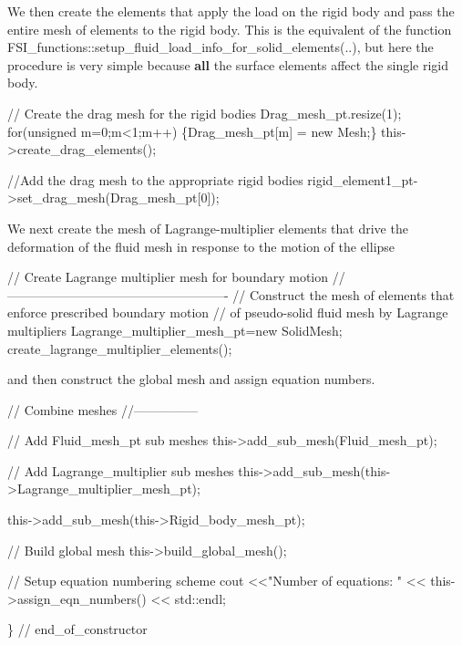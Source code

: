 We then create the elements that apply the load on the rigid body and pass the entire mesh of elements to the rigid body. This is the equivalent of the function {\ttfamily F\+S\+I\+\_\+functions\+::setup\+\_\+fluid\+\_\+load\+\_\+info\+\_\+for\+\_\+solid\+\_\+elements}(..), but here the procedure is very simple because {\bfseries  all } the surface elements affect the single rigid body.


\begin{DoxyCodeInclude}

 \textcolor{comment}{// Create the drag mesh for the rigid bodies}
 Drag\_mesh\_pt.resize(1);
 \textcolor{keywordflow}{for}(\textcolor{keywordtype}{unsigned} m=0;m<1;m++) \{Drag\_mesh\_pt[m] = \textcolor{keyword}{new} Mesh;\}
 this->create\_drag\_elements();

 \textcolor{comment}{//Add the drag mesh to the appropriate rigid bodies}
 rigid\_element1\_pt->set\_drag\_mesh(Drag\_mesh\_pt[0]);

\end{DoxyCodeInclude}


We next create the mesh of Lagrange-\/multiplier elements that drive the deformation of the fluid mesh in response to the motion of the ellipse


\begin{DoxyCodeInclude}



 \textcolor{comment}{// Create Lagrange multiplier mesh for boundary motion}
 \textcolor{comment}{//----------------------------------------------------}
 \textcolor{comment}{// Construct the mesh of elements that enforce prescribed boundary motion}
 \textcolor{comment}{// of pseudo-solid fluid mesh by Lagrange multipliers}
 Lagrange\_multiplier\_mesh\_pt=\textcolor{keyword}{new} SolidMesh;
 create\_lagrange\_multiplier\_elements();

\end{DoxyCodeInclude}


and then construct the global mesh and assign equation numbers.


\begin{DoxyCodeInclude}


 \textcolor{comment}{// Combine meshes}
 \textcolor{comment}{//---------------}
 
 \textcolor{comment}{// Add Fluid\_mesh\_pt sub meshes}
 this->add\_sub\_mesh(Fluid\_mesh\_pt);

 \textcolor{comment}{// Add Lagrange\_multiplier sub meshes}
 this->add\_sub\_mesh(this->Lagrange\_multiplier\_mesh\_pt);

 this->add\_sub\_mesh(this->Rigid\_body\_mesh\_pt);
 
 \textcolor{comment}{// Build global mesh}
 this->build\_global\_mesh();
    
 \textcolor{comment}{// Setup equation numbering scheme}
 cout <<\textcolor{stringliteral}{"Number of equations: "} << this->assign\_eqn\_numbers() << std::endl;
 
\} \textcolor{comment}{// end\_of\_constructor}

\end{DoxyCodeInclude}


